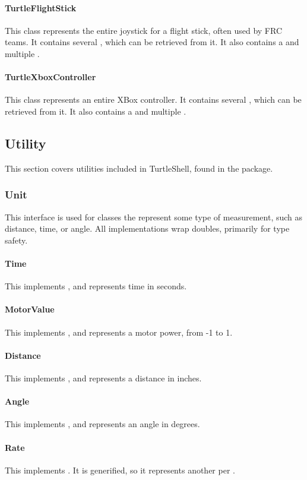 \documentclass[]{report}
\begin{document}
\paragraph{TurtleFlightStick}
This class represents the entire joystick for a flight stick, often used by FRC teams.
It contains several , which can be retrieved from it.
It also contains a  and multiple .
\paragraph{TurtleXboxController}
This class represents an entire XBox controller.
It contains several , which can be retrieved from it.
It also contains a  and multiple .

\subsection{Utility}
This section covers utilities included in TurtleShell, found in the  package.

\subsubsection{Unit}
This interface is used for classes the represent some type of measurement, such as distance, time, or angle.
All implementations wrap doubles, primarily for type safety.

\paragraph{Time}
This implements , and represents time in seconds.
\paragraph{MotorValue}
This implements , and represents a motor power, from -1 to 1.
\paragraph{Distance}
This implements , and represents a distance in inches.
\paragraph{Angle}
This implements , and represents an angle in degrees.
\paragraph{Rate}
This implements . It is generified, so it represents another  per .
\end{document}
